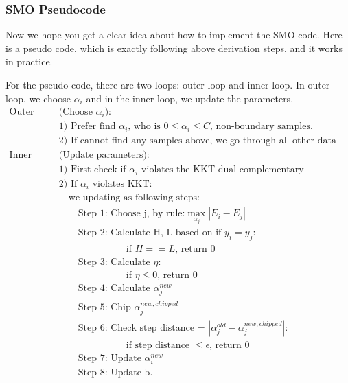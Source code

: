 \documentclass[a4paper]{article}
\begin{document}
\subsubsection{SMO Pseudocode}
Now we hope you get a clear idea about how to implement the SMO code. Here is a pseudo code, which is exactly following above derivation steps, and it works in practice. 

For the pseudo code, there are two loops: outer loop and inner loop. In outer loop, we choose $\alpha_i$ and in the inner loop, we update the parameters.
\begin{align*}
\text{Outer loop}&\text{(Choose $\alpha_i$):} \\
	& \text{1) Prefer find $\alpha_i$, who is $0 \leq \alpha_i \leq C$, non-boundary samples.}\\
	& \text{2) If cannot find any samples above, we go through all other data samples.} \\
\text{Inner loop}&\text{(Update parameters):} \\
&\text{1) First check if $\alpha_i$ violates the KKT 	dual complementary }\\
&\text{2) If $\alpha_i$ violates KKT:} \\
& \quad \text{we updating as following steps:} \\
& \quad \quad \text{Step 1: Choose j, by rule:} \max_{\alpha_j}|E_i - E_j| \\
& \quad \quad \text{Step 2: Calculate H, L based on if } y_i = y_j: \\
& \quad \quad \quad \quad \quad \quad \quad \text{if $H == L$, return $0$} \\
& \quad \quad \text{Step 3: Calculate } \eta: \\
& \quad \quad \quad \quad \quad \quad \quad \text{if $\eta \leq 0$, return $0$} \\
& \quad \quad \text{Step 4: Calculate } \alpha_j^{new} \\
& \quad \quad \text{Step 5: Chip } \alpha_j^{new, chipped } \\
& \quad \quad \text{Step 6: Check step distance = } |\alpha_j^{old} - \alpha_j^{new,chipped}|: \\
& \quad \quad \quad \quad \quad \quad \quad \text{if step distance $\leq \epsilon$, return $0$} \\
& \quad \quad \text{Step 7: Update } \alpha_i^{new} \\
& \quad \quad \text{Step 8: Update b}.
\end{align*}
\end{document}
